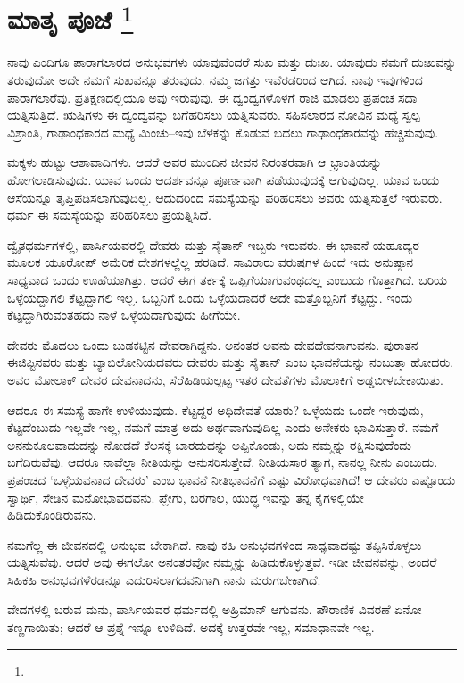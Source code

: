 
\chapter[ಮಾತೃ ಪೂಜೆ ]{ಮಾತೃ ಪೂಜೆ \protect\footnote{}}

ನಾವು ಎಂದಿಗೂ ಪಾರಾಗಲಾರದ ಅನುಭವಗಳು ಯಾವುವೆಂದರೆ ಸುಖ ಮತ್ತು ದುಃಖ. ಯಾವುದು ನಮಗೆ ದುಃಖವನ್ನು ತರುವುದೋ ಅದೇ ನಮಗೆ ಸುಖವನ್ನೂ ತರುವುದು. ನಮ್ಮ ಜಗತ್ತು ಇವೆರಡರಿಂದ ಆಗಿದೆ. ನಾವು ಇವುಗಳಿಂದ ಪಾರಾಗಲಾರೆವು. ಪ್ರತಿಕ್ಷಣದಲ್ಲಿಯೂ ಅವು ಇರುವುವು. ಈ ದ್ವಂದ್ವಗಳೊಳಗೆ ರಾಜಿ ಮಾಡಲು ಪ್ರಪಂಚ ಸದಾ ಯತ್ನಿಸುತ್ತಿದೆ. ಋಷಿಗಳು ಈ ದ್ವಂದ್ವವನ್ನು ಬಗೆಹರಿಸಲು ಯತ್ನಿಸುವರು. ಸಹಿಸಲಾರದ ನೋವಿನ ಮಧ್ಯೆ ಸ್ವಲ್ಪ ವಿಶ್ರಾಂತಿ, ಗಾಢಾಂಧಕಾರದ ಮಧ್ಯೆ ಮಿಂಚು–ಇವು ಬೆಳಕನ್ನು ಕೊಡುವ ಬದಲು ಗಾಢಾಂಧಕಾರವನ್ನು ಹೆಚ್ಚಿಸುವುವು.

ಮಕ್ಕಳು ಹುಟ್ಟು ಆಶಾವಾದಿಗಳು. ಆದರೆ ಅವರ ಮುಂದಿನ ಜೀವನ ನಿರಂತರವಾಗಿ ಆ ಭ್ರಾಂತಿಯನ್ನು ಹೋಗಲಾಡಿಸುವುದು. ಯಾವ ಒಂದು ಆದರ್ಶವನ್ನೂ ಪೂರ್ಣವಾಗಿ ಪಡೆಯುವುದಕ್ಕೆ ಆಗುವುದಿಲ್ಲ. ಯಾವ ಒಂದು ಆಸೆಯನ್ನೂ ತೃಪ್ತಿಪಡಿಸಲಾಗುವುದಿಲ್ಲ. ಆದುದರಿಂದ ಸಮಸ್ಯೆಯನ್ನು ಪರಿಹರಿಸಲು ಅವರು ಯತ್ನಿಸುತ್ತಲೆ ಇರುವರು. ಧರ್ಮ ಈ ಸಮಸ್ಯೆಯನ್ನು ಪರಿಹರಿಸಲು ಪ್ರಯತ್ನಿಸಿದೆ.

ದ್ವೈತಧರ್ಮಗಳಲ್ಲಿ, ಪಾರ್ಸಿಯವರಲ್ಲಿ ದೇವರು ಮತ್ತು ಸೈತಾನ್​ ಇಬ್ಬರು ಇರುವರು. ಈ ಭಾವನೆ ಯಹೂದ್ಯರ ಮೂಲಕ ಯೂರೋಪ್​ ಅಮೆರಿಕ ದೇಶಗಳಲ್ಲೆಲ್ಲ ಹರಡಿದೆ. ಸಾವಿರಾರು ವರುಷಗಳ ಹಿಂದೆ ಇದು ಅನುಷ್ಠಾನ ಸಾಧ್ಯವಾದ ಒಂದು ಊಹೆಯಾಗಿತ್ತು. ಆದರೆ ಈಗ ತರ್ಕಕ್ಕೆ ಒಪ್ಪಿಗೆಯಾಗುವಂಥದಲ್ಲ ಎಂಬುದು ಗೊತ್ತಾಗಿದೆ. ಬರಿಯ ಒಳ್ಳೆಯದ್ದಾಗಲಿ ಕೆಟ್ಟದ್ದಾಗಲಿ ಇಲ್ಲ. ಒಬ್ಬನಿಗೆ ಒಂದು ಒಳ್ಳೆಯದಾದರೆ ಅದೇ ಮತ್ತೊಬ್ಬನಿಗೆ ಕೆಟ್ಟದ್ದು. ಇಂದು ಕೆಟ್ಟದ್ದಾಗಿರುವಂತಹದು ನಾಳೆ ಒಳ್ಳೆಯದಾಗುವುದು ಹೀಗೆಯೇ.

ದೇವರು ಮೊದಲು ಒಂದು ಬುಡಕಟ್ಟಿನ ದೇವರಾಗಿದ್ದನು. ಅನಂತರ ಅವನು ದೇವ\-ದೇವನಾಗುವನು. ಪುರಾತನ ಈಜಿಪ್ಟಿನವರು ಮತ್ತು ಬ್ಯಾಬಿಲೋನಿಯದವರು ದೇವರು ಮತ್ತು ಸೈತಾನ್​ ಎಂಬ ಭಾವನೆಯನ್ನು ನಂಬುತ್ತಾ ಹೋದರು. ಅವರ ಮೋಲಾಕ್​ ದೇವರ ದೇವನಾದನು, ಸೆರೆಹಿಡಿಯಲ್ಪಟ್ಟ ಇತರ ದೇವತೆಗಳು ಮೊಲಾಕಿಗೆ ಅಡ್ಡಬೀಳಬೇಕಾಯಿತು.

ಆದರೂ ಈ ಸಮಸ್ಯೆ ಹಾಗೇ ಉಳಿಯುವುದು. ಕೆಟ್ಟದ್ದರ ಅಧಿದೇವತೆ ಯಾರು? ಒಳ್ಳೆಯದು ಒಂದೇ ಇರುವುದು, ಕೆಟ್ಟದೆಂಬುದು ಇಲ್ಲವೇ ಇಲ್ಲ, ನಮಗೆ ಮಾತ್ರ ಅದು ಅರ್ಥವಾಗುವುದಿಲ್ಲ ಎಂದು ಅನೇಕರು ಭಾವಿಸುತ್ತಾರೆ. ನಮಗೆ ಅನನುಕೂಲವಾದುದನ್ನು ನೋಡದೆ ಕೆಲಸಕ್ಕೆ ಬಾರದುದನ್ನು ಅಪ್ಪಿಕೊಂಡು, ಅದು ನಮ್ಮನ್ನು ರಕ್ಷಿಸುವುದೆಂದು ಬಗೆದಿರುವೆವು. ಆದರೂ ನಾವೆಲ್ಲಾ ನೀತಿಯನ್ನು ಅನುಸರಿಸುತ್ತೇವೆ. ನೀತಿಯಸಾರ ತ್ಯಾಗ, ನಾನಲ್ಲ ನೀನು ಎಂಬುದು. ಪ್ರಪಂಚದ ‘ಒಳ್ಳೆಯವನಾದ ದೇವರು’ ಎಂಬ ಭಾವನೆ ನೀತಿಭಾವನೆಗೆ ಎಷ್ಟು ವಿರೋಧವಾಗಿದೆ! ಆ ದೇವರು ಎಷ್ಟೊಂದು ಸ್ವಾರ್ಥಿ, ಸೇಡಿನ ಮನೋಭಾವದವನು. ಪ್ಲೇಗು, ಬರಗಾಲ, ಯುದ್ಧ ಇವನ್ನು ತನ್ನ ಕೈಗಳಲ್ಲಿಯೇ ಹಿಡಿದುಕೊಂಡಿರುವನು.

ನಮಗೆಲ್ಲ ಈ ಜೀವನದಲ್ಲಿ ಅನುಭವ ಬೇಕಾಗಿದೆ. ನಾವು ಕಹಿ ಅನುಭವಗಳಿಂದ ಸಾಧ್ಯವಾದಷ್ಟು ತಪ್ಪಿಸಿಕೊಳ್ಳಲು ಯತ್ನಿಸುವೆವು. ಆದರೆ ಅವು ಈಗಲೋ ಅನಂತರವೋ ನಮ್ಮನ್ನು ಹಿಡಿದುಕೊಳ್ಳುತ್ತವೆ. ಇಡೀ ಜೀವನವನ್ನು, ಅಂದರೆ ಸಿಹಿಕಹಿ ಅನುಭವಗಳೆರಡನ್ನೂ ಎದುರಿಸಲಾಗದವನಿಗಾಗಿ ನಾನು ಮರುಗಬೇಕಾಗಿದೆ.

ವೇದಗಳಲ್ಲಿ ಬರುವ ಮನು, ಪಾರ್ಸಿಯವರ ಧರ್ಮದಲ್ಲಿ ಅಹ್ರಿಮಾನ್​ ಆಗುವನು. ಪೌರಾಣಿಕ ವಿವರಣೆ ಏನೋ ತಣ್ಣಗಾಯಿತು; ಆದರೆ ಆ ಪ್ರಶ್ನೆ ಇನ್ನೂ ಉಳಿದಿದೆ. ಅದಕ್ಕೆ ಉತ್ತರವೇ ಇಲ್ಲ, ಸಮಾಧಾನವೇ ಇಲ್ಲ.

